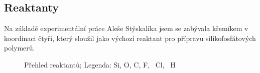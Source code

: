 \documentclass[
digital, %
table,   %
lof,     %
lot,     %
oneside,
]{fithesis3}
\begin{document}
\subsection{Reaktanty}
Na základě experimentální práce Aleše Stýskalíka \cite{Styskalik2015thesis} jsem se zabývala křemíkem v koordinaci čtyři, který sloužil jako výchozí reaktant pro přípravu silikofosfátových polymerů.
\begin{figure}
\centering
{}
\caption{Přehled reaktantů; Legenda:  Si,  O,  C,  F, ~Cl, ~H}
\label{prehled_male_modely}
\end{figure}
\end{document}
